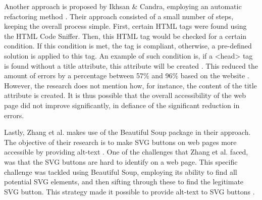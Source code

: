Another approach is proposed by Ikhsan \& Candra, employing an automatic refactoring method \cite{Ikhsan2018}. Their approach consisted of a small number of steps, keeping the overall process simple. First, certain HTML tags were found using the HTML Code Sniffer. Then, this HTML tag would be checked for a certain condition. If this condition is met, the tag is compliant, otherwise, a pre-defined solution is applied to this tag. An example of such condition is, if a <head> tag is found without a title attribute, this attribute will be created \cite{Ikhsan2018}. This reduced the amount of errors by a percentage between 57\% and 96\% based on the website \cite{Ikhsan2018}. However, the research does not mention how, for instance, the content of the title attribute is created. It is thus possible that the overall accessibility of the web page did not improve significantly, in defiance of the significant reduction in errors.

Lastly, Zhang et al. makes use of the Beautiful Soup package in their approach. The objective of their research is to make SVG buttons on web pages more accessible by providing alt-text \cite{Zhang2024}. One of the challenges that Zhang et al. faced, was that the SVG buttons are hard to identify on a web page. This specific challenge was tackled using Beautiful Soup, employing its ability to find all potential SVG elements, and then sifting through these to find the legitimate SVG button. This strategy made it possible to provide alt-text to SVG buttons \cite{Zhang2024}.